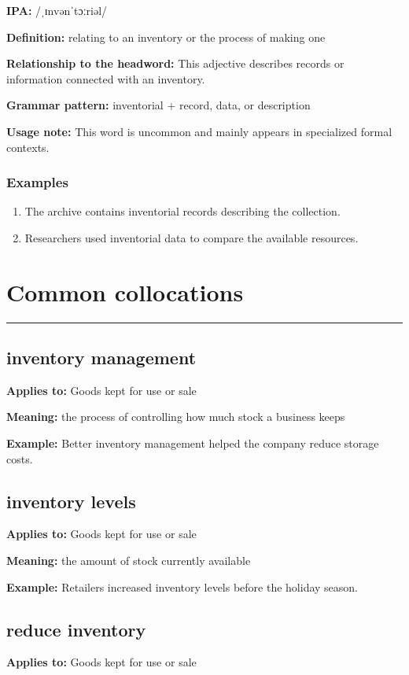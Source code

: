\documentclass[11pt]{article}
\newcommand{\sectionrule}{\par\vspace{-0.5em}\noindent\textcolor{Accent}{\rule{\linewidth}{0.6pt}}\par}
\begin{document}
\textbf{IPA:} /ˌɪnvənˈtɔːriəl/

\textbf{Definition:} relating to an inventory or the process of making one

\textbf{Relationship to the headword:} This adjective describes records or information connected with an inventory.

\textbf{Grammar pattern:} inventorial + record, data, or description

\textbf{Usage note:} This word is uncommon and mainly appears in specialized formal contexts.

\subsubsection{Examples}
\begin{enumerate}
  \item The archive contains inventorial records describing the collection.
  \item Researchers used inventorial data to compare the available resources.
\end{enumerate}

\section{Common collocations}
\sectionrule
\subsection{inventory management}
\textbf{Applies to:} Goods kept for use or sale

\textbf{Meaning:} the process of controlling how much stock a business keeps

\textbf{Example:} Better inventory management helped the company reduce storage costs.

\subsection{inventory levels}
\textbf{Applies to:} Goods kept for use or sale

\textbf{Meaning:} the amount of stock currently available

\textbf{Example:} Retailers increased inventory levels before the holiday season.

\subsection{reduce inventory}
\textbf{Applies to:} Goods kept for use or sale
\end{document}
